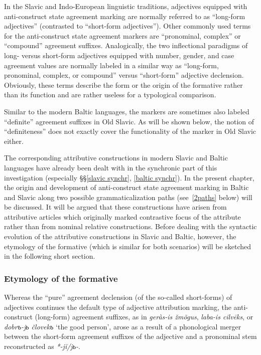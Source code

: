 In the Slavic and Indo-European linguistic traditions, adjectives equipped with anti\hyp{}construct state agreement marking are normally referred to as “long-form adjectives” (contrasted to “short-form adjectives”). Other commonly used terms for the anti\hyp{}construct state agreement markers are “pronominal, complex” or “compound” agreement suffixes. Analogically, the two inflectional paradigms of long- versus short-form adjectives equipped with number, gender, and case agreement values are normally labeled in a similar way as “long-form, pronominal, complex, or compound” versus “short-form” adjective declension. Obviously, these terms describe the form or the origin of the formative rather than its function and are rather useless for a typological comparison.

Similar to the modern Baltic languages, the markers are sometimes also labeled “definite” agreement suffixes in Old Slavic. As will be shown below, the notion of “definiteness” does not exactly cover the functionality of the marker in Old Slavic either.

The corresponding attributive constructions in modern Slavic and Baltic languages have already been dealt with in the synchronic part of this investigation (especially \S\S\ref{slavic synchr}, \ref{baltic synchr}). In the present chapter, the origin and development of anti\hyp{}construct state agreement marking in Baltic and Slavic along two possible grammaticalization paths (see~\ref{2paths} below) will be discussed. It will be argued that these constructions have arisen from attributive articles which originally marked contrastive focus of the attribute rather than from nominal relative constructions. Before dealing with the syntactic evolution of the attributive constructions in Slavic and Baltic, however, the etymology of the formative (which is similar for both scenarios) will be sketched in the following short section.

\subsubsection{Etymology of the formative} 
Whereas the “pure” agreement declension (of the so-called short-forms) of adjectives continues the  default type of adjective attribution marking, the anti\hyp{}construct (long-form) agreement suffixes, as in  \textit{geràs-is žmõgus},  \textit{laba-is cilvēks}, or  \textit{dobrъ-jь človekъ} ‘the good person’, arose as a result of a phonological merger between the short-form agreement suffixes of the adjective and a pronominal stem reconstructed as  \textit{*-jĭ/jь-}.

